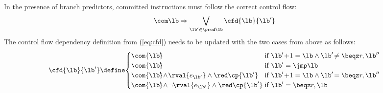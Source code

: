 \documentclass[conference]{IEEEtran}
\begin{document}
In the presence of branch predictors, committed instructions must follow the correct control flow:
\begin{equation}
{\com \lb} \Rightarrow {\bigvee\limits_{{\lb'} \in \pred \lb} \cfd{\lb}{\lb'}} \nonumber
\end{equation}
The control flow dependency definition from (\ref{eq:cfd}) needs to be updated with the two cases from above as follows:
{\small
\[   
\cfd{\lb}{\lb'} \define \!
     \begin{cases}
       \com{\lb'\!\!} & \hspace*{-2.5mm}\text{if } \lb' \! + \! 1 = \lb \land \lb' \!\neq \beqz r,\lb'' \\
       \com{\lb'\!\!} & \hspace*{-2.5mm}\text{if } \lb' = \jmp \lb \\
       {\com{\lb'\!\!} \!\land\! \rval{e_{\lb'}}} \land {\red \cp{\lb'}} & \hspace*{-2.5mm}\text{if } \lb' \! + \! 1 = \lb \land \lb' \!= \beqz r,\lb'' \\
       {\com{\lb'\!\!} \!\land\! {\neg \rval{e_{\lb'}}}} \land {\red \cp{\lb'}} & \hspace*{-2.5mm}\text{if } \lb' = \beqz r,\lb \\
     \end{cases}
\]}
\end{document}
